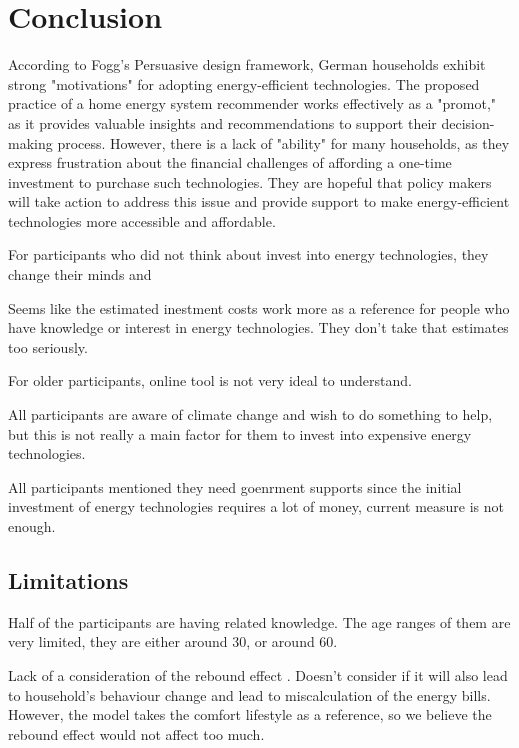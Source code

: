 \chapter{Conclusion}

According to Fogg's Persuasive design framework, 
German households exhibit strong "motivations" for adopting energy-efficient technologies. 
The proposed practice of a home energy system recommender works effectively as a "promot," as it provides valuable insights and recommendations to support their decision-making process. 
However, there is a lack of "ability" for many households, 
as they express frustration about the financial challenges of affording a one-time investment to purchase such technologies. 
They are hopeful that policy makers will take action to address this issue and provide support to make energy-efficient technologies more accessible and affordable.

For participants who did not think about invest into energy technologies,
they change their minds and 

Seems like the estimated inestment costs work more as a reference for people who have knowledge or interest in energy technologies. 
They don't take that estimates too seriously. 

For older participants, online tool is not very ideal to understand. 

All participants are aware of climate change and wish to do something to help, but this is not really a main factor for them to invest into expensive energy technologies. 

All participants mentioned they need goenrment supports since the initial investment of energy technologies requires a lot of money, current measure is not enough. 

\section{Limitations}

Half of the participants are having related knowledge. 
The age ranges of them are very limited, they are either around 30, or around 60. 

Lack of a consideration of the rebound effect \cite{Herring2007}. 
Doesn't consider if it will also lead to household's behaviour change and lead to miscalculation of the energy bills. 
However, the model takes the comfort lifestyle as a reference, so we believe the rebound effect would not affect too much. 
